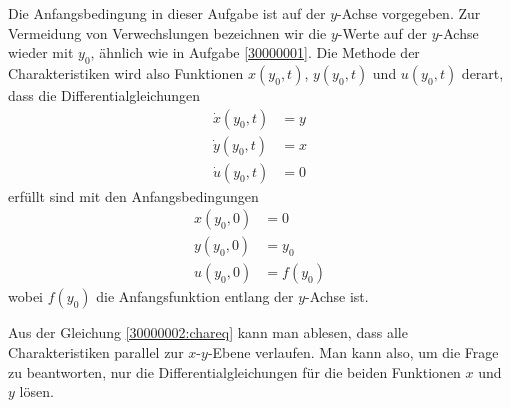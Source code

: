 \begin{loesung}
Die Anfangsbedingung in dieser Aufgabe ist auf der $y$-Achse vorgegeben.
Zur Vermeidung von Verwechslungen bezeichnen wir die $y$-Werte auf
der $y$-Achse wieder mit $y_0$, ähnlich wie in Aufgabe \ref{30000001}.
Die Methode der Charakteristiken wird also Funktionen $x(y_0,t)$,
$y(y_0,t)$ und $u(y_0,t)$ derart, dass die Differentialgleichungen
\begin{equation}
\begin{aligned}
\dot x(y_0, t)&=y\\
\dot y(y_0, t)&=x\\
\dot u(y_0, t)&=0
\end{aligned}
\label{30000002:chareq}
\end{equation}
erfüllt sind mit den Anfangsbedingungen 
\begin{align*}
x(y_0, 0)&=0\\
y(y_0, 0)&=y_0\\
u(y_0, 0)&=f(y_0)
\end{align*}
wobei $f(y_0)$ die Anfangsfunktion entlang der $y$-Achse ist.
\begin{teilaufgaben}
\item
Aus der Gleichung \eqref{30000002:chareq} kann man ablesen,
dass alle Charakteristiken parallel zur $x$-$y$-Ebene verlaufen.
Man kann also, um die Frage zu beantworten, nur die Differentialgleichungen
für die beiden Funktionen $x$ und $y$ lösen.


\end{teilaufgaben}
\end{loesung}
